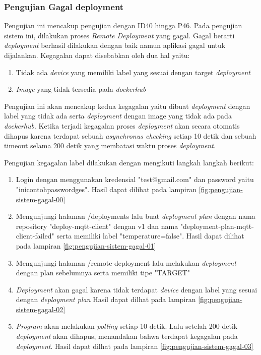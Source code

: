 \subsubsection{Pengujian Gagal deployment}
Pengujian ini mencakup pengujian dengan ID40 hingga P46. Pada pengujian sistem ini, dilakukan proses \textit{Remote Deployment} yang gagal. Gagal berarti \textit{deployment} berhasil dilakukan dengan baik namun aplikasi gagal untuk dijalankan. Kegagalan dapat disebabkan oleh dua hal yaitu:
\begin{enumerate}
  \item Tidak ada \textit{device} yang memiliki label yang sesuai dengan target \textit{deployment}
  \item \textit{Image} yang tidak tersedia pada \textit{dockerhub}
\end{enumerate}
Pengujian ini akan mencakup kedua kegagalan yaitu dibuat \textit{deployment} dengan label yang tidak ada serta \textit{deployment} dengan image yang tidak ada pada \textit{dockerhub}. Ketika terjadi kegagalan proses \textit{deployment} akan secara otomatis dihapus karena terdapat sebuah \textit{asynchronus checking} setiap 10 detik dan sebuah timeout selama 200 detik yang membatasi waktu proses \textit{deployment}.

Pengujian kegagalan label dilakukan dengan mengikuti langkah langkah berikut:

\begin{enumerate}
  \item Login dengan menggunakan kredensial "test@gmail.com" dan password yaitu "inicontohpasswordges". Hasil dapat dilihat pada lampiran \ref{fig:pengujian-sistem-gagal-00}
  \item Mengunjungi halaman /deployments lalu buat \textit{deployment plan} dengan nama repository "deploy-mqtt-client" dengan v1 dan nama "deployment-plan-mqtt-client-failed" serta memiliki label "temperature=false". Hasil dapat dilihat pada lampiran \ref{fig:pengujian-sistem-gagal-01}
  \item Mengunjungi halaman /remote-deployment lalu melakukan \textit{deployment} dengan plan sebelumnya serta memiliki tipe "TARGET"
  \item \textit{Deployment} akan gagal karena tidak terdapat \textit{device} dengan label yang sesuai dengan \textit{deployment plan} Hasil dapat dilhat pada lampiran \ref{fig:pengujian-sistem-gagal-02}
  \item \textit{Program} akan melakukan \textit{polling} setiap 10 detik. Lalu setelah 200 detik \textit{deployment} akan dihapus, menandakan bahwa terdapat kegagalan pada \textit{deployment}. Hasil dapat dilhat pada lampiran \ref{fig:pengujian-sistem-gagal-03}
\end{enumerate}

